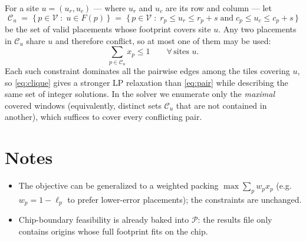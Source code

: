 \documentclass[11pt]{article}
\newcommand{\Pset}{\mathcal{P}}
\newcommand{\Vset}{\mathcal{V}}
\newcommand{\Fp}{F}
\begin{document}
For a site $u = (u_r, u_c)$ --- where $u_r$ and $u_c$ are its row and column --- let
\[
  \mathcal{C}_u \;=\; \bigl\{\, p \in \Vset \;:\; u \in \Fp(p) \,\bigr\}
  \;=\; \bigl\{\, p \in \Vset \;:\; r_p \le u_r \le r_p + s
  \;\text{and}\; c_p \le u_c \le c_p + s \,\bigr\}
\]
be the set of valid placements whose footprint covers site $u$. Any two placements in
$\mathcal{C}_u$ share $u$ and therefore conflict, so at most one of them may be used:
\begin{equation}
  \sum_{p \in \mathcal{C}_u} x_p \le 1
  \qquad \forall\, \text{sites } u .
  \label{eq:clique}
\end{equation}
Each such constraint dominates all the pairwise edges among the tiles covering $u$, so
\eqref{eq:clique} gives a stronger LP relaxation than \eqref{eq:pair} while describing the
same set of integer solutions. In the solver we enumerate only the \emph{maximal} covered
windows (equivalently, distinct sets $\mathcal{C}_u$ that are not contained in another),
which suffices to cover every conflicting pair.

\section{Notes}
\begin{itemize}[itemsep=2pt]
  \item The objective can be generalized to a weighted packing
        $\max \sum_p w_p x_p$ (e.g.\ $w_p = 1 - \ell_p$ to prefer lower-error placements);
        the constraints are unchanged.
  \item Chip-boundary feasibility is already baked into $\Pset$: the results file only
        contains origins whose full footprint fits on the chip.
\end{itemize}
\end{document}
